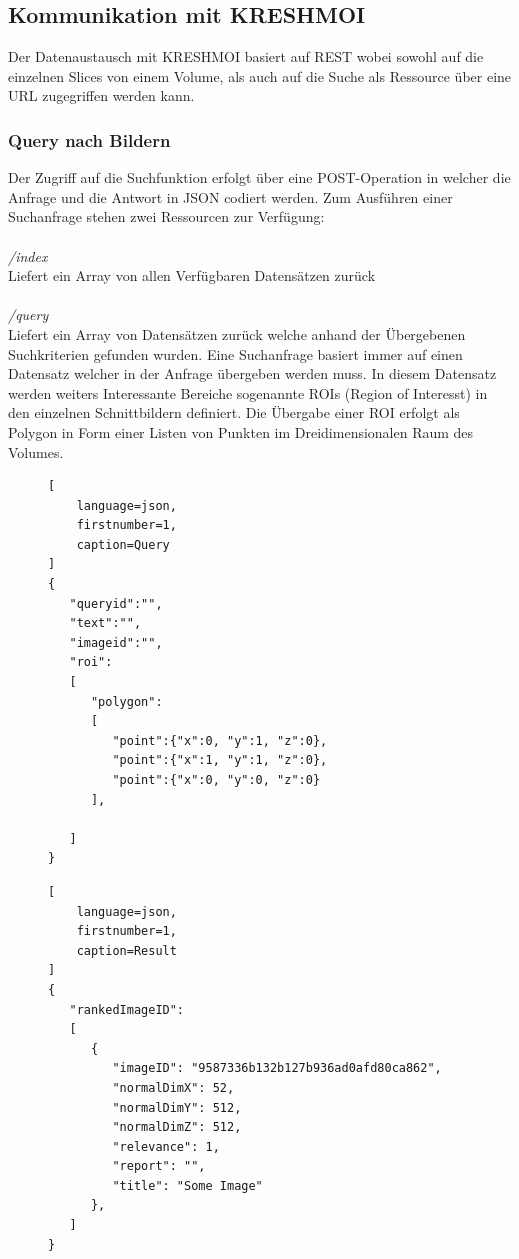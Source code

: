 \subsection{Kommunikation mit KRESHMOI}
\label{sec:Kommunikation mit KRESHMOI}
Der Datenaustausch mit KRESHMOI basiert auf REST wobei sowohl auf die einzelnen Slices von einem Volume, als auch auf die Suche als Ressource über eine URL zugegriffen werden kann.

\subsubsection{Query nach Bildern}
\label{sec:Query nach Bildern}
Der Zugriff auf die Suchfunktion erfolgt über eine POST-Operation in welcher die Anfrage und die Antwort in JSON codiert werden.
Zum Ausführen einer Suchanfrage stehen zwei Ressourcen zur Verfügung:
\\
\\
\textit{/index}\\
Liefert ein Array von allen Verfügbaren Datensätzen zurück 
\\
\\
\textit{/query}\\
Liefert ein Array von Datensätzen zurück welche anhand der Übergebenen Suchkriterien gefunden wurden.
Eine Suchanfrage basiert immer auf einen Datensatz welcher in der Anfrage übergeben werden muss.
In diesem Datensatz werden weiters Interessante Bereiche sogenannte ROIs (Region of Interesst) in den einzelnen Schnittbildern definiert.
Die Übergabe einer ROI erfolgt als Polygon in Form einer Listen von Punkten im Dreidimensionalen Raum des Volumes.
\begin{figure}[t]
\begin{lstlisting}[
	language=json,
	firstnumber=1,
	caption=Query
]
{
   "queryid":"",
   "text":"",
   "imageid":"",
   "roi": 
   [
      "polygon":
      [
         "point":{"x":0, "y":1, "z":0},
         "point":{"x":1, "y":1, "z":0},
         "point":{"x":0, "y":0, "z":0}
      ],

   ]
}
\end{lstlisting}
\end{figure}


\begin{figure}[t]
\begin{lstlisting}[
	language=json,
	firstnumber=1,
	caption=Result
]
{
   "rankedImageID": 
   [
      {
         "imageID": "9587336b132b127b936ad0afd80ca862",
         "normalDimX": 52,
         "normalDimY": 512,
         "normalDimZ": 512,
         "relevance": 1,
         "report": "",
         "title": "Some Image"
      },
   ]
}
\end{lstlisting}
\end{figure}

